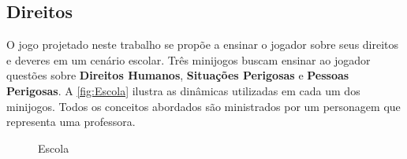 \subsection{Direitos}\label{subsec:2}

O jogo projetado neste trabalho se propõe a ensinar o jogador sobre seus direitos e deveres em um cenário escolar. Três minijogos buscam ensinar ao jogador questões sobre \textbf{Direitos Humanos}, \textbf{Situações Perigosas} e \textbf{Pessoas Perigosas}. A \autoref{fig:Escola} ilustra as dinâmicas utilizadas em cada um dos minijogos. Todos os conceitos abordados são ministrados por um personagem que representa uma professora. 

\begin{figure}%
  \vspace{-20pt}
  \caption{\label{fig:Escola}Escola}

\end{figure}

